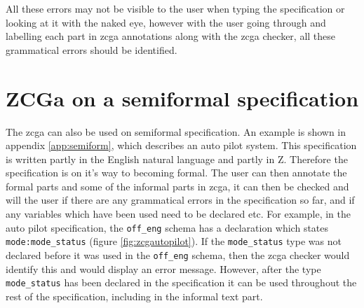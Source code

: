 All these errors may not be visible to the user when typing the specification or
looking at it with the naked eye, however with the user going through and
labelling each part in \gls{zcga} annotations along with the \gls{zcga} checker,
all these grammatical errors should be identified.


\section{ZCGa on a semiformal specification}
\label{sec:zcgaonsemi}

The \gls{zcga} can also be used on semiformal specification. An example is shown
in appendix \ref{app:semiform}, which describes an auto pilot system. This
specification is written partly in the English natural language and partly in Z.
Therefore the specification is on it's way to becoming formal. The user can then
annotate the formal parts and some of the informal parts in \gls{zcga}, it can
then be checked and will the user if there are any grammatical errors in the
specification so far, and if any variables which have been used need to be
declared etc. For example, in the auto pilot specification, the \verb|off_eng|
schema has a declaration which states \verb|mode:mode_status| (figure
\ref{fig:zcgautopilot}). If the \verb|mode_status| type was not declared before
it was used in the \verb|off_eng| schema, then the \gls{zcga} checker would
identify this and would display an error message. However, after the type
\verb|mode_status| has been declared in the specification it can be used
throughout the rest of the specification, including in the informal text part.

